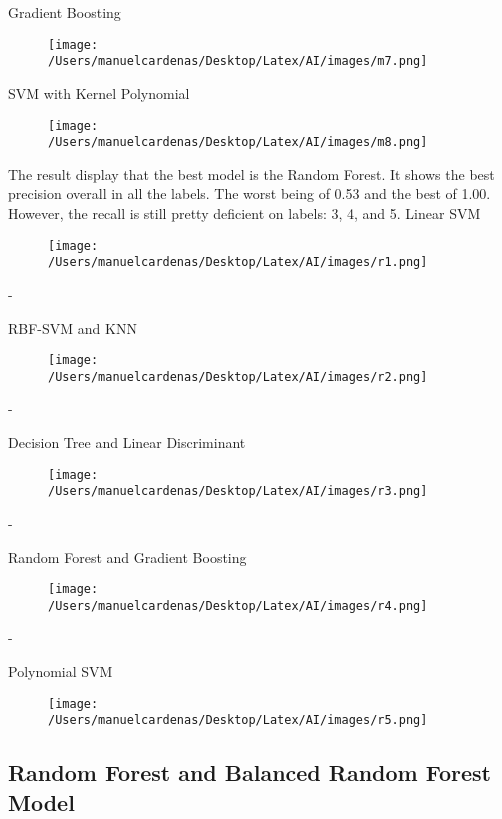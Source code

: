 \documentclass{article}
\begin{document}
    Gradient Boosting
    \begin{figure}[h]
        \centering
        \texttt{[image: /Users/manuelcardenas/Desktop/Latex/AI/images/m7.png]}
        \label{fig:m7}
    \end{figure}

    SVM with Kernel Polynomial\pagebreak
    \begin{figure}[h]
        \centering
        \texttt{[image: /Users/manuelcardenas/Desktop/Latex/AI/images/m8.png]}
        \label{fig:m8}
    \end{figure}

    The result display that the best model is the Random Forest. It shows the best precision overall in all the labels.
     The worst being of 0.53 and the best of 1.00. However, the recall is still pretty deficient on labels: 3, 4, and 5. \pagebreak
     Linear SVM
    \begin{figure}[h]
        \centering
        \texttt{[image: /Users/manuelcardenas/Desktop/Latex/AI/images/r1.png]}
        \label{fig:r1}
    \end{figure}
    - \pagebreak

    RBF-SVM and KNN
    \begin{figure}[h]
        \centering
        \texttt{[image: /Users/manuelcardenas/Desktop/Latex/AI/images/r2.png]}
        \label{fig:r2}
    \end{figure}
    - \pagebreak

    Decision Tree and Linear Discriminant
    \begin{figure}[h]
        \centering
        \texttt{[image: /Users/manuelcardenas/Desktop/Latex/AI/images/r3.png]}
        \label{fig:r3}
    \end{figure}
    - \pagebreak

    Random Forest and Gradient Boosting
    \begin{figure}[h]
        \centering
        \texttt{[image: /Users/manuelcardenas/Desktop/Latex/AI/images/r4.png]}
        \label{fig:r4}
    \end{figure}
    - \pagebreak

    Polynomial SVM
    \begin{figure}[h]
        \centering
        \texttt{[image: /Users/manuelcardenas/Desktop/Latex/AI/images/r5.png]}
        \label{fig:r5}
    \end{figure}

    \subsection{Random Forest and Balanced Random Forest Model}
\end{document}
